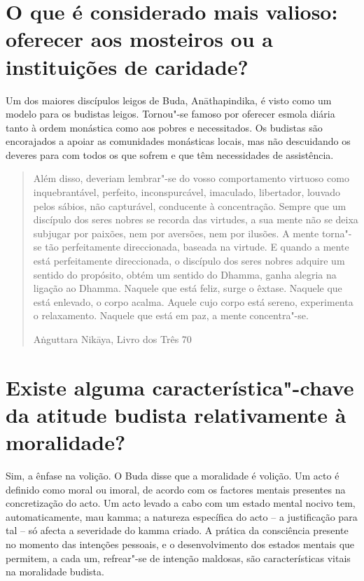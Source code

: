 \section{O que é considerado mais valioso: oferecer aos mosteiros ou a
  instituições de caridade?}

Um dos maiores discípulos leigos de Buda, Anāthapindika, é visto como um
modelo para os budistas leigos. Tornou"-se famoso por oferecer esmola
diária tanto à ordem monástica como aos pobres e necessitados. Os
budistas são encorajados a apoiar as comunidades monásticas locais, mas
não descuidando os deveres para com todos os que sofrem e que têm
necessidades de assistência.

\clearpage
{}

\begin{verse}

Além disso, deveriam lembrar"-se do vosso comportamento virtuoso
como inquebrantável, perfeito, inconspurcável, imaculado, libertador,
louvado pelos sábios, não capturável, conducente à concentração. Sempre
que um discípulo dos seres nobres se recorda das virtudes, a sua mente
não se deixa subjugar por paixões, nem por aversões, nem por ilusões. A
mente torna"-se tão perfeitamente direccionada, baseada na virtude. E
quando a mente está perfeitamente direccionada, o discípulo dos seres
nobres adquire um sentido do propósito, obtém um sentido do Dhamma,
ganha alegria na ligação ao Dhamma. Naquele que está feliz, surge o
êxtase. Naquele que está enlevado, o corpo acalma. Aquele cujo corpo
está sereno, experimenta o relaxamento. Naquele que está em paz, a mente
concentra"-se.

{\raggedleft
Aṅguttara Nikāya, Livro dos Três 70
\par}

\end{verse}

\section{Existe alguma característica"-chave da atitude budista relativamente à
  moralidade?}

Sim, a ênfase na volição. O Buda disse que a moralidade é volição. Um
acto é definido como moral ou imoral, de acordo com os factores mentais
presentes na concretização do acto. Um acto levado a cabo com um estado
mental nocivo tem, automaticamente, mau kamma; a natureza específica do
acto -- a justificação para tal -- só afecta a severidade do kamma
criado. A prática da consciência presente no momento das intenções
pessoais, e o desenvolvimento dos estados mentais que permitem, a cada
um, refrear"-se de intenção maldosas, são características vitais na
moralidade budista.

